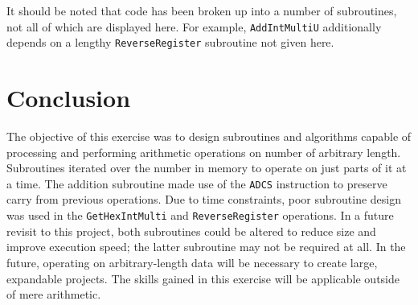 \documentclass[CMPE]{KGCOEReport}
\begin{document}
It should be noted that code has been broken up into a number of subroutines,
not all of which are displayed here. For example, \texttt{AddIntMultiU}
additionally depends on a lengthy \texttt{ReverseRegister} subroutine not
given here.

\section*{Conclusion}

The objective of this exercise was to design subroutines and algorithms capable
of processing and performing arithmetic operations on number of arbitrary
length. Subroutines iterated over the number in memory to operate on just parts
of it at a time. The addition subroutine made use of the \texttt{ADCS}
instruction to preserve carry from previous operations. Due to time
constraints, poor subroutine design was used in the \texttt{GetHexIntMulti} and
\texttt{ReverseRegister} operations. In a future revisit to this project, both
subroutines could be altered to reduce size and improve execution speed; the
latter subroutine may not be required at all. In the future, operating on
arbitrary-length data will be necessary to create large, expandable projects.
The skills gained in this exercise will be applicable outside of mere
arithmetic.


\end{document}
